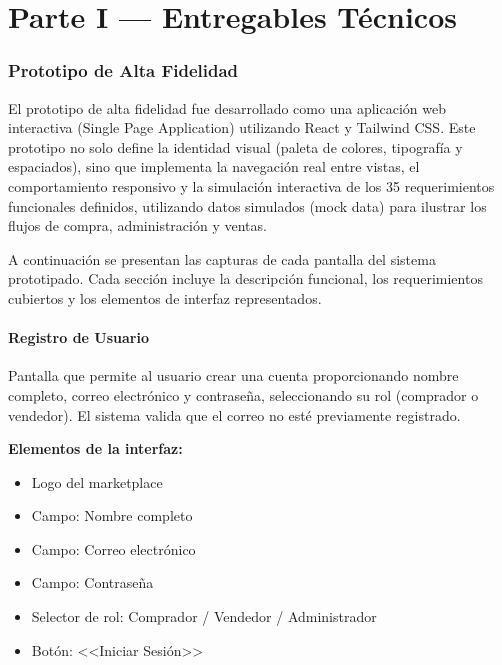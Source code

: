\documentclass[12pt,a4paper]{article}
\begin{document}
\part*{Parte I --- Entregables Técnicos}

\section{Prototipo de Alta Fidelidad}

El prototipo de alta fidelidad fue desarrollado como una aplicación web interactiva (Single Page Application) utilizando React y Tailwind CSS. Este prototipo no solo define la identidad visual (paleta de colores, tipografía y espaciados), sino que implementa la navegación real entre vistas, el comportamiento responsivo y la simulación interactiva de los 35 requerimientos funcionales definidos, utilizando datos simulados (mock data) para ilustrar los flujos de compra, administración y ventas.

A continuación se presentan las capturas de cada pantalla del sistema prototipado. Cada sección incluye la descripción funcional, los requerimientos cubiertos y los elementos de interfaz representados.

\subsection{Registro de Usuario}

Pantalla que permite al usuario crear una cuenta proporcionando nombre completo, correo electrónico y contraseña, seleccionando su rol (comprador o vendedor). El sistema valida que el correo no esté previamente registrado.

\textbf{Elementos de la interfaz:}
\begin{itemize}[nosep]
    \item Logo del marketplace
    \item Campo: Nombre completo
    \item Campo: Correo electrónico
    \item Campo: Contraseña
    \item Selector de rol: Comprador / Vendedor / Administrador
    \item Botón: <<Iniciar Sesión>>

\end{itemize}
\end{document}
